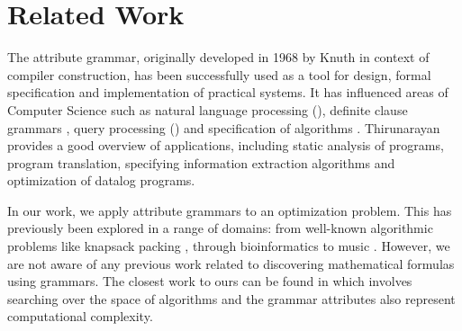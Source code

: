 \vspace{-2mm}
\section{Related Work} \label{relatedwork}
\vspace{-2mm}

The attribute grammar, originally developed in 1968 by Knuth \cite{knuth1968semantics} in context of compiler
construction, has been successfully used as a tool for design, formal specification
and implementation of practical systems. It has influenced areas of
Computer Science such as natural language processing (\citealp{hafiz2011modular, starkie2002inferring}), 
definite clause grammars \cite{bratko2001prolog}, query processing (\citealp{koch2007attribute,ramakrishnan1991top}) and specification of algorithms \cite{bellanova1984examples}.
Thirunarayan \cite{thirunarayan2009attribute} provides a good overview of 
applications, including static analysis of programs, program translation, specifying information
extraction algorithms and optimization of datalog programs.

In our work, we apply attribute grammars to an optimization problem. This has previously been explored in a range of domains: from well-known algorithmic problems 
like knapsack packing \cite{o2004solving}, through bioinformatics \cite{waldispuhl2002approximate} to music \cite{desainte1994using}.
However, we are not aware of any previous work related to discovering mathematical formulas using grammars. The closest work to ours can be found in \cite{cheung1999attribute} which involves searching
over the space of algorithms and the grammar attributes also represent computational complexity.



